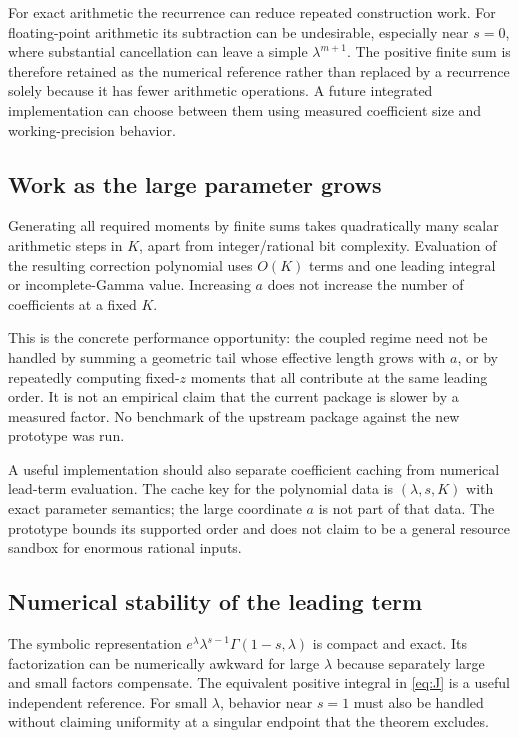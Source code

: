 \documentclass[11pt,a4paper]{article}
\begin{document}
For exact arithmetic the recurrence can reduce repeated construction work.
For floating-point arithmetic its subtraction can be undesirable, especially
near $s=0$, where substantial cancellation can leave a simple $\lambda^{m+1}$.
The positive finite sum is therefore retained as the numerical reference
rather than replaced by a recurrence solely because it has fewer arithmetic
operations. A future integrated implementation can choose between them using
measured coefficient size and working-precision behavior.

\subsection{Work as the large parameter grows}

Generating all required moments by finite sums takes quadratically many scalar
arithmetic steps in $K$, apart from integer/rational bit complexity. Evaluation
of the resulting correction polynomial uses $O(K)$ terms and one leading
integral or incomplete-Gamma value. Increasing $a$ does not increase the
number of coefficients at a fixed $K$.

This is the concrete performance opportunity: the coupled regime need not be
handled by summing a geometric tail whose effective length grows with $a$, or
by repeatedly computing fixed-$z$ moments that all contribute at the same
leading order. It is not an empirical claim that the current package is slower
by a measured factor. No benchmark of the upstream package against the new
prototype was run.

A useful implementation should also separate coefficient caching from numerical
lead-term evaluation. The cache key for the polynomial data is
$(\lambda,s,K)$ with exact parameter semantics; the large coordinate $a$ is not
part of that data. The prototype bounds its supported order and does not claim
to be a general resource sandbox for enormous rational inputs.

\subsection{Numerical stability of the leading term}

The symbolic representation $e^\lambda\lambda^{s-1}\Gamma(1-s,\lambda)$ is
compact and exact. Its factorization can be numerically awkward for large
$\lambda$ because separately large and small factors compensate.
The equivalent positive integral in \eqref{eq:J} is a useful independent
reference. For small $\lambda$, behavior near $s=1$ must also be handled
without claiming uniformity at a singular endpoint that the theorem excludes.
\end{document}
